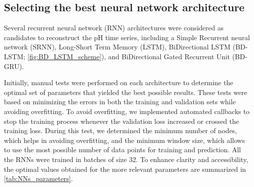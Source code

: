 \subsection{Selecting the best neural network architecture}

Several recurrent neural network (RNN) architectures were considered as
candidates to reconstruct the pH time series, including a Simple Recurrent
neural network (SRNN), Long-Short Term Memory (LSTM), BiDirectional LSTM
(BD-LSTM; \cref{fig:BD_LSTM_scheme}), and BiDirectional Gated Recurrent Unit
(BD-GRU).

Initially, manual tests were performed on each architecture to determine
the optimal set of parameters that yielded the best possible results. These
tests were based on minimizing the errors in both the training and validation
sets while avoiding overfitting. To avoid overfitting, we implemented automated
callbacks to stop the training process whenever the validation loss increased
or crossed the training loss. During this test, we determined the minimum
number of nodes, which helps in avoiding overfitting, and the minimum window
size, which allows to use the most possible number of data points for training
and prediction. All the RNNs were trained in batches of size 32. To enhance
clarity and accessibility, the optimal values obtained for the more relevant
parameters are summarized in \cref{tab:NNs_parameters}.

